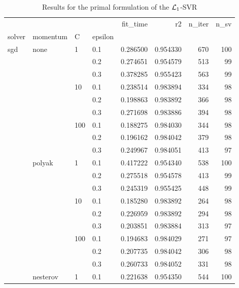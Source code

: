 \begin{table}[H]
\centering
\caption{Results for the primal formulation of the $\protect \mathcal{L}_1$-SVR}
\label{primal_l1_svr_cv_results}
\begin{tabular}{llllrrrr}
\toprule
          &   &     &     &  fit\_time &        r2 &  n\_iter &  n\_sv \\
solver & momentum & C & epsilon &           &           &         &       \\
\midrule
sgd & none & 1   & 0.1 &  0.286500 &  0.954330 &     670 &   100 \\
          &   &     & 0.2 &  0.274651 &  0.954579 &     513 &    99 \\
          &   &     & 0.3 &  0.378285 &  0.955423 &     563 &    99 \\
          &   & 10  & 0.1 &  0.238514 &  0.983894 &     334 &    98 \\
          &   &     & 0.2 &  0.198863 &  0.983892 &     366 &    98 \\
          &   &     & 0.3 &  0.271698 &  0.983886 &     394 &    98 \\
          &   & 100 & 0.1 &  0.188275 &  0.984030 &     344 &    98 \\
          &   &     & 0.2 &  0.196162 &  0.984042 &     379 &    98 \\
          &   &     & 0.3 &  0.249967 &  0.984051 &     413 &    97 \\
          & polyak & 1   & 0.1 &  0.417222 &  0.954340 &     538 &   100 \\
          &   &     & 0.2 &  0.275518 &  0.954578 &     413 &    99 \\
          &   &     & 0.3 &  0.245319 &  0.955425 &     448 &    99 \\
          &   & 10  & 0.1 &  0.185280 &  0.983892 &     264 &    98 \\
          &   &     & 0.2 &  0.226959 &  0.983892 &     294 &    98 \\
          &   &     & 0.3 &  0.203851 &  0.983884 &     313 &    97 \\
          &   & 100 & 0.1 &  0.194683 &  0.984029 &     271 &    97 \\
          &   &     & 0.2 &  0.207735 &  0.984042 &     306 &    98 \\
          &   &     & 0.3 &  0.260733 &  0.984052 &     331 &    98 \\
          & nesterov & 1   & 0.1 &  0.221638 &  0.954350 &     544 &   100 \\

\end{tabular}
\end{table}
